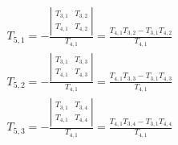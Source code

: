 \begin{frame}
\begin{block}{}
\begin{eqnarray*}
T_{5,1}=-\frac{\left|\begin{array}{cc}
T_{3,1}&T_{3,2}\\
T_{4,1}&T_{4,2}
\end{array}\right|}{T_{4,1}}=\frac{T_{4,1}T_{3,2}-T_{3,1}T_{4,2}}{T_{4,1}}\\
T_{5,2}=-\frac{\left|\begin{array}{cc}
T_{3,1}&T_{3,3}\\
T_{4,1}&T_{4,3}
\end{array}\right|}{T_{4,1}}=\frac{T_{4,1}T_{3,3}-T_{3,1}T_{4,3}}{T_{4,1}}\\
T_{5,3}=-\frac{\left|\begin{array}{cc}
T_{3,1}&T_{3,4}\\
T_{4,1}&T_{4,4}
\end{array}\right|}{T_{4,1}}=\frac{T_{4,1}T_{3,4}-T_{3,1}T_{4,4}}{T_{4,1}}
\end{eqnarray*}
\end{block}
\end{frame}

\endinput